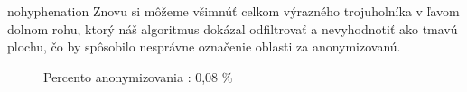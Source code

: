 \begin{hyphenrules}{nohyphenation}
Znovu si môžeme všimnúť celkom výrazného trojuholníka v ľavom dolnom rohu, ktorý náš algoritmus dokázal odfiltrovať a nevyhodnotiť ako tmavú plochu, čo by spôsobilo nesprávne označenie oblasti za anonymizovanú.

\begin{figure}[H]
\begin{minipage}[t]{.4\linewidth}
\caption{Percento anonymizovania : 0,08 \%}
\label{fig:5.4} 
\end{minipage}\hfill
\begin{minipage}[b]{.4\linewidth}

\end{minipage}
\end{figure}
\end{hyphenrules}
